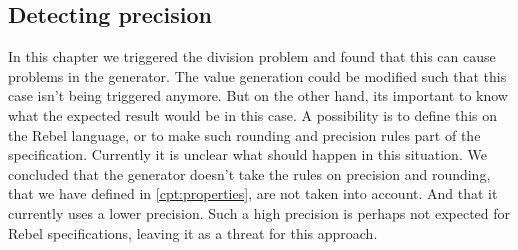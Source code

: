 \subsection*{Detecting precision}
In this chapter we triggered the division problem and found that this can cause problems in the generator. The value generation could be modified such that this case isn't being triggered anymore. But on the other hand, its important to know what the expected result would be in this case. A possibility is to define this on the Rebel language, or to make such rounding and precision rules part of the specification. Currently it is unclear what should happen in this situation. We concluded that the generator doesn't take the rules on precision and rounding, that we have defined in \autoref{cpt:properties}, are not taken into account. And that it currently uses a lower precision. Such a high precision is perhaps not expected for Rebel specifications, leaving it as a threat for this approach.

